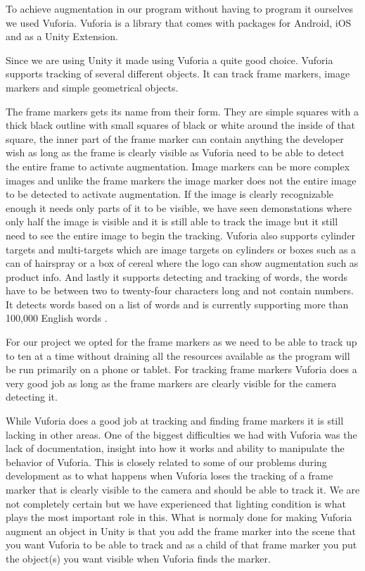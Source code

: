 To achieve augmentation in our program without having to program it ourselves we used Vuforia.
Vuforia is a library that comes with packages for Android, iOS and as a Unity Extension.

Since we are using Unity it made using Vuforia a quite good choice.
Vuforia supports tracking of several different objects. It can track frame markers, image markers and simple geometrical objects.

The frame markers gets its name from their form. They are simple squares with a thick black outline with small squares of black or white around the inside of that square, the inner part of the frame marker can
contain anything the developer wish as long as the frame is clearly visible as Vuforia need to be able to detect the entire frame to activate augmentation.
Image markers can be more complex images and unlike the frame markers the image marker does not the entire image to be detected to activate augmentation.
If the image is clearly recognizable enough it needs only parts of it to be visible, we have seen demonstations where only half the image is visible and it is still able to track the image but it still need to see the entire image to begin the tracking.
Vuforia also supports cylinder targets and multi-targets which are image targets on cylinders or boxes such as a can of hairspray or a box of cereal where the logo can show augmentation such as product info.
And lastly it supports detecting and tracking of words, the words have to be between two to twenty-four characters long and not contain numbers.
It detects words based on a list of words and is currently supporting more than 100,000 English words \cite{VuforiaTextMarker}.

For our project we opted for the frame markers as we need to be able to track up to ten at a time without draining all the resources available as the program will be run primarily on a phone or tablet.
For tracking frame markers Vuforia does a very good job as long as the frame markers are clearly visible for the camera detecting it.

While Vuforia does a good job at tracking and finding frame markers it is still lacking in other areas.
One of the biggest difficulties we had with Vuforia was the lack of documentation, insight into how it works and ability to manipulate the behavior of Vuforia.
This is closely related to some of our problems during development as to what happens when Vuforia loses the tracking of a frame marker  that is clearly visible
 to the camera and should be able to track it.
We are not completely certain but we have experienced that lighting condition is what plays the most important role in this.
What is normaly done for making Vuforia augment an object in Unity is that you add the frame marker into the scene that you want Vuforia to be able to track and as a child of that frame marker you 
put the object(s) you want visible when Vuforia finds the marker.

